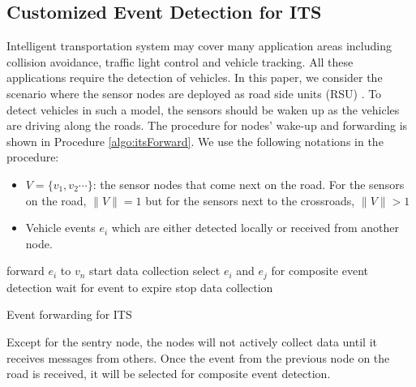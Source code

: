 \subsection{Customized Event Detection for ITS}
Intelligent transportation system may cover many application areas including collision avoidance, traffic light control and vehicle tracking. All these applications require the detection of vehicles. In this paper, we consider the scenario where the sensor nodes are deployed as road side units (RSU) \cite{klein:its}. To detect vehicles in such a model, the sensors should be waken up as the vehicles are driving along the roads. The procedure for nodes' wake-up and forwarding is shown in Procedure \ref{algo:itsForward}. We use the following notations in the procedure:
\begin{itemize}
\item \(V=\{v_1, v_2 \cdots \}\): the sensor nodes that come next on the road. For the sensors on the road, \(\|V\|=1\) but for the sensors next to the crossroads, \(\|V\|>1\)
\item Vehicle events \(e_i\) which are either detected locally or received from another node.
\end{itemize}

\begin{algorithm}
\begin{algorithmic}[1]
			\STATE forward \(e_i\) to \(v_n\)
		\ENDFOR
	\ENDIF
		\STATE start data collection
			\STATE select \(e_i\) and \(e_j\) for composite event detection
		\ELSE
			\STATE wait for event to expire
		\ENDIF
		\STATE stop data collection
	\ENDIF
\end{algorithmic}
\caption{Event forwarding for ITS}
\label{algo:itsForward}
\end{algorithm}

Except for the sentry node, the nodes will not actively collect data until it receives messages from others. Once the event from the previous node on the road is received, it will be selected for composite event detection.